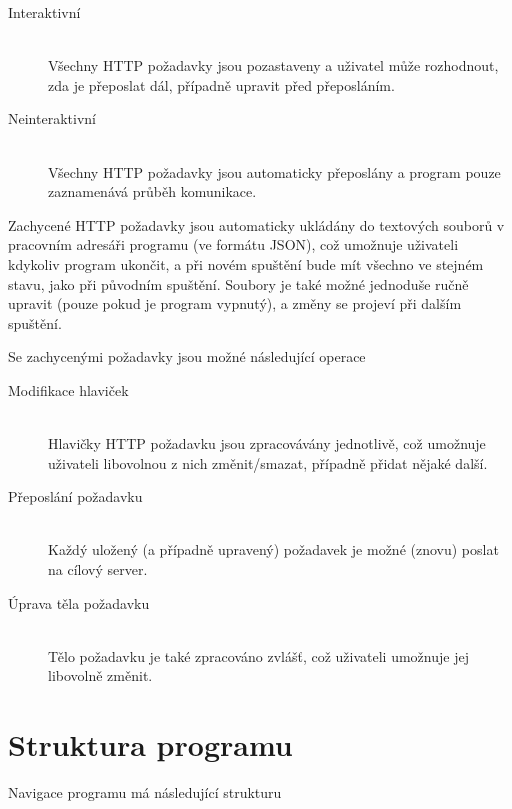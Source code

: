 \documentclass{article}
\begin{document}
\begin{description}
	\item[Interaktivní] \hfill \\
		Všechny HTTP požadavky jsou pozastaveny a uživatel může rozhodnout, zda je přeposlat dál, případně upravit před přeposláním.
	\item[Neinteraktivní] \hfill \\
		Všechny HTTP požadavky jsou automaticky přeposlány a program pouze zaznamenává průběh komunikace.
\end{description}

Zachycené HTTP požadavky jsou automaticky ukládány do textových souborů v pracovním adresáři programu (ve formátu JSON), což umožnuje uživateli kdykoliv program ukončit, a při novém spuštění bude mít všechno ve stejném stavu, jako při původním spuštění. Soubory je také možné jednoduše ručně upravit (pouze pokud je program vypnutý), a změny se projeví při dalším spuštění.

Se zachycenými požadavky jsou možné následující operace

\begin{description}
	\item[Modifikace hlaviček] \hfill \\
		Hlavičky HTTP požadavku jsou zpracovávány jednotlivě, což umožnuje uživateli libovolnou z nich změnit/smazat, případně přidat nějaké další.
	\item[Přeposlání požadavku] \hfill \\
		Každý uložený (a případně upravený) požadavek je možné (znovu) poslat na cílový server.
	\item[Úprava těla požadavku] \hfill \\
		Tělo požadavku je také zpracováno zvlášť, což uživateli umožnuje jej libovolně změnit.
\end{description}

\section{Struktura programu}

Navigace programu má následující strukturu
\end{document}
